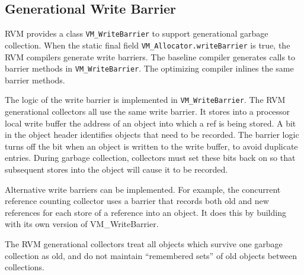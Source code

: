 \subsection{Generational Write Barrier} \label{sssec:writebarrier}
RVM provides a class {\tt VM\_WriteBarrier} to support generational garbage 
collection.
When the static 
final field {\tt VM\_Allocator.writeBarrier} is true,
the RVM compilers generate write barriers.
The baseline compiler generates calls to barrier methods in {\tt VM\_WriteBarrier}.
The optimizing compiler inlines the same barrier methods.

The logic of the write barrier is implemented in {\tt VM\_WriteBarrier}.
The RVM generational collectors all use the same write barrier.
It stores into a processor local write buffer the address of an object
into which a ref is being stored.
A bit in the object header identifies objects that need to be recorded.
The barrier logic turns off the bit when an object is written to the write
buffer, to avoid duplicate entries.
During garbage collection, collectors must set these bits back on so that
subsequent stores into the object will cause it to be recorded.

Alternative write barriers can be implemented. For example, the concurrent
reference counting collector uses a barrier that records both old and new
references for each store of a reference into an object. It does this
by building with its own version of VM\_WriteBarrier.

The RVM generational collectors treat all objects which
survive one garbage collection as old, and do not maintain ``remembered sets''
of old objects between collections.

